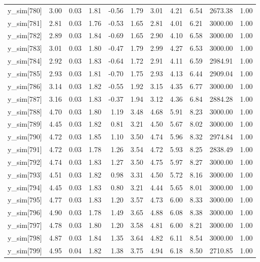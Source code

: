 \begin{table}[ht]
\begin{tabular}{rrrrrrrrrrr}
  y\_sim[780] & 3.00 & 0.03 & 1.81 & -0.56 & 1.79 & 3.01 & 4.21 & 6.54 & 2673.38 & 1.00 \\ 
  y\_sim[781] & 2.81 & 0.03 & 1.76 & -0.53 & 1.65 & 2.81 & 4.01 & 6.21 & 3000.00 & 1.00 \\ 
  y\_sim[782] & 2.89 & 0.03 & 1.84 & -0.69 & 1.65 & 2.90 & 4.10 & 6.58 & 3000.00 & 1.00 \\ 
  y\_sim[783] & 3.01 & 0.03 & 1.80 & -0.47 & 1.79 & 2.99 & 4.27 & 6.53 & 3000.00 & 1.00 \\ 
  y\_sim[784] & 2.92 & 0.03 & 1.83 & -0.64 & 1.72 & 2.91 & 4.11 & 6.59 & 2984.91 & 1.00 \\ 
  y\_sim[785] & 2.93 & 0.03 & 1.81 & -0.70 & 1.75 & 2.93 & 4.13 & 6.44 & 2909.04 & 1.00 \\ 
  y\_sim[786] & 3.14 & 0.03 & 1.82 & -0.55 & 1.92 & 3.15 & 4.35 & 6.77 & 3000.00 & 1.00 \\ 
  y\_sim[787] & 3.16 & 0.03 & 1.83 & -0.37 & 1.94 & 3.12 & 4.36 & 6.84 & 2884.28 & 1.00 \\ 
  y\_sim[788] & 4.70 & 0.03 & 1.80 & 1.19 & 3.48 & 4.68 & 5.91 & 8.23 & 3000.00 & 1.00 \\ 
  y\_sim[789] & 4.45 & 0.03 & 1.82 & 0.81 & 3.21 & 4.50 & 5.67 & 8.02 & 3000.00 & 1.00 \\ 
  y\_sim[790] & 4.72 & 0.03 & 1.85 & 1.10 & 3.50 & 4.74 & 5.96 & 8.32 & 2974.84 & 1.00 \\ 
  y\_sim[791] & 4.72 & 0.03 & 1.78 & 1.26 & 3.54 & 4.72 & 5.93 & 8.25 & 2838.49 & 1.00 \\ 
  y\_sim[792] & 4.74 & 0.03 & 1.83 & 1.27 & 3.50 & 4.75 & 5.97 & 8.27 & 3000.00 & 1.00 \\ 
  y\_sim[793] & 4.51 & 0.03 & 1.82 & 0.98 & 3.31 & 4.50 & 5.72 & 8.16 & 3000.00 & 1.00 \\ 
  y\_sim[794] & 4.45 & 0.03 & 1.83 & 0.80 & 3.21 & 4.44 & 5.65 & 8.01 & 3000.00 & 1.00 \\ 
  y\_sim[795] & 4.77 & 0.03 & 1.83 & 1.20 & 3.57 & 4.73 & 6.00 & 8.33 & 3000.00 & 1.00 \\ 
  y\_sim[796] & 4.90 & 0.03 & 1.78 & 1.49 & 3.65 & 4.88 & 6.08 & 8.38 & 3000.00 & 1.00 \\ 
  y\_sim[797] & 4.78 & 0.03 & 1.80 & 1.20 & 3.58 & 4.81 & 6.00 & 8.21 & 3000.00 & 1.00 \\ 
  y\_sim[798] & 4.87 & 0.03 & 1.84 & 1.35 & 3.64 & 4.82 & 6.11 & 8.54 & 3000.00 & 1.00 \\ 
  y\_sim[799] & 4.95 & 0.04 & 1.82 & 1.38 & 3.75 & 4.94 & 6.18 & 8.50 & 2710.85 & 1.00 \\ 

\end{tabular}
\end{table}
